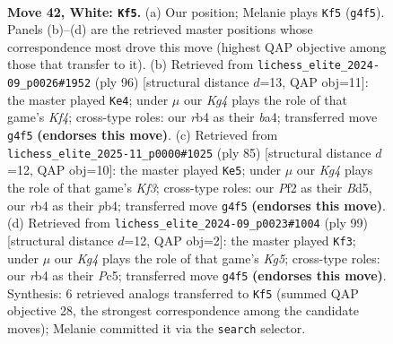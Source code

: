 \documentclass[11pt]{article}
\begin{document}
\clearpage

\begin{figure}[p]\centering
\begin{subfigure}{0.46\textwidth}\centering
\resizebox{\linewidth}{!}{%
\newchessgame
\chessboard[
  setfen={7k/p2p4/2p2p2/8/1r1P2K1/8/5P1P/8 w - - 0 42},
  showmover=false,
  pgfstyle=straightmove, color=movearrow, markmove={g4-f5}
]}
\caption{}
\end{subfigure}\hfill
\begin{subfigure}{0.46\textwidth}\centering
\resizebox{\linewidth}{!}{%
\newchessgame
\chessboard[
  setfen={8/p7/1p2k3/1P6/b2p1K2/3P4/8/8 w - - 0 49},
  showmover=false,
  pgfstyle=straightmove, color=movearrow, markmove={f4-e4}
]}
\caption{}
\end{subfigure}
\\[4pt]
\begin{subfigure}{0.46\textwidth}\centering
\resizebox{\linewidth}{!}{%
\newchessgame
\chessboard[
  setfen={8/7p/p4k2/2pb4/1P4P1/2P5/5K1P/8 b - - 0 43},
  showmover=false,
  pgfstyle=straightmove, color=movearrow, markmove={f6-e5}
]}
\caption{}
\end{subfigure}\hfill
\begin{subfigure}{0.46\textwidth}\centering
\resizebox{\linewidth}{!}{%
\newchessgame
\chessboard[
  setfen={8/8/6p1/p1pK4/P5k1/1P1P4/5P2/8 b - - 4 50},
  showmover=false,
  pgfstyle=straightmove, color=movearrow, markmove={g4-f3}
]}
\caption{}
\end{subfigure}
\caption{\textbf{Move 42, White: \texttt{Kf5}.} (a) Our position; Melanie plays \texttt{Kf5} (\texttt{g4f5}). Panels (b)--(d) are the retrieved master positions whose correspondence most drove this move (highest QAP objective among those that transfer to it). (b) Retrieved from \texttt{lichess\_elite\_2024-09\_p0026\#1952} (ply 96) [structural distance $d$=13, QAP obj=11]: the master played \texttt{Ke4}; under $\mu$ our \emph{Kg4} plays the role of that game's \emph{Kf4}; cross-type roles: our \emph{r}b4 as their \emph{b}a4; transferred move \texttt{g4f5} \textbf{(endorses this move)}. (c) Retrieved from \texttt{lichess\_elite\_2025-11\_p0000\#1025} (ply 85) [structural distance $d$=12, QAP obj=10]: the master played \texttt{Ke5}; under $\mu$ our \emph{Kg4} plays the role of that game's \emph{Kf3}; cross-type roles: our \emph{P}f2 as their \emph{B}d5, our \emph{r}b4 as their \emph{p}b4; transferred move \texttt{g4f5} \textbf{(endorses this move)}. (d) Retrieved from \texttt{lichess\_elite\_2024-09\_p0023\#1004} (ply 99) [structural distance $d$=12, QAP obj=2]: the master played \texttt{Kf3}; under $\mu$ our \emph{Kg4} plays the role of that game's \emph{Kg5}; cross-type roles: our \emph{r}b4 as their \emph{P}c5; transferred move \texttt{g4f5} \textbf{(endorses this move)}. Synthesis: 6 retrieved analogs transferred to \texttt{Kf5} (summed QAP objective 28, the strongest correspondence among the candidate moves); Melanie committed it via the \texttt{search} selector.}
\label{fig:thought-m82}
\end{figure}
\end{document}
